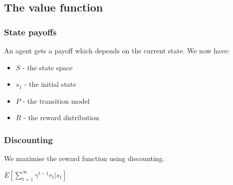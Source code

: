 
\subsection{The value function}

\subsubsection{State payoffs}

An agent gets a payoff which depends on the current state. We now have:

\begin{itemize}
\item \(S\) - the state space
\item \(s_1\) - the initial state
\item \(P\) - the transition model
\item \(R\) - the reward distribution
\end{itemize}

\subsubsection{Discounting}

We maximise the reward function using discounting.

\(E[\sum_{t=1}^\infty \gamma^{t-1}r_t|s_1]\)

